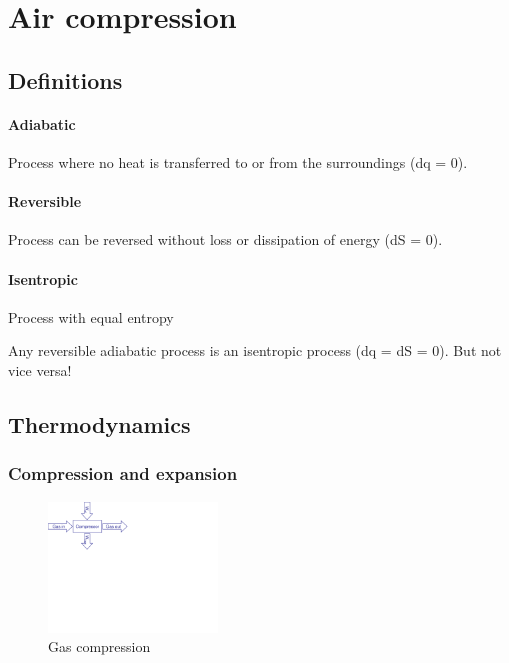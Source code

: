\documentclass[11pt,a4paper,english,twoside]{scrreprt}
\begin{document}
\section{Air compression}
\label{sec:air_comp}

\subsection{Definitions}


\paragraph{Adiabatic }
Process where no heat is transferred to or from the surroundings (dq = 0).

\paragraph{Reversible}
Process can be reversed without loss or dissipation of energy (dS = 0).

\paragraph{Isentropic}
Process with equal entropy

Any reversible adiabatic process is an isentropic process (dq = dS = 0). But not vice versa!


\subsection{Thermodynamics}

\subsubsection{Compression and expansion}

\begin{figure}
  \centering
  \includegraphics*[width=0.4\textwidth,angle=0]{FCF_Figure_Compressor.pdf}
  \caption[Gas compression]{Gas compression}
  \label{fig:GasCompression}
\end{figure}
\end{document}

